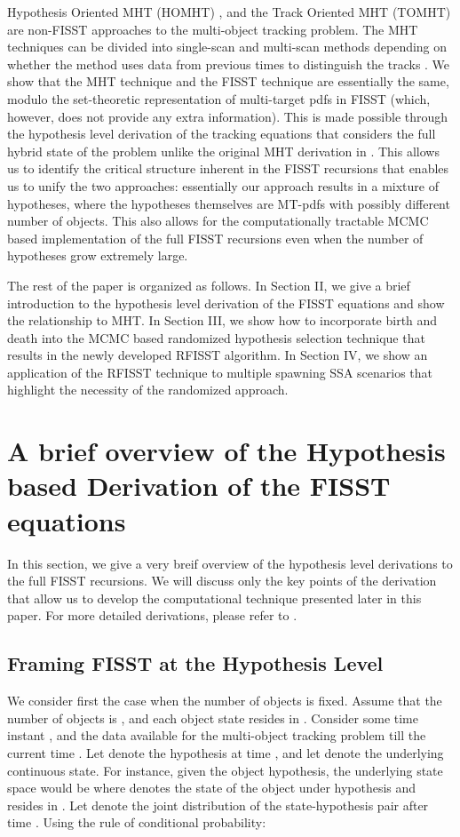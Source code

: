 \documentclass[10pt, conference]{IEEEtran}
\begin{document}
Hypothesis Oriented MHT (HOMHT) \cite{HOMHT, BarShalom1, BarShalom2, mcmcda}, and the Track Oriented MHT (TOMHT) \cite{TOMHT} are non-FISST approaches to the multi-object tracking problem. The MHT techniques can be divided into single-scan and multi-scan methods depending on whether the method uses data from previous times to distinguish the tracks \cite{BarShalom1, jpda, mcmcda}. We show that  the MHT technique and the FISST technique are essentially the same, modulo the set-theoretic representation of multi-target pdfs in FISST (which, however, does not provide any extra information). This is made possible through the hypothesis level derivation of the tracking equations that considers the full hybrid state of the problem unlike the original MHT derivation in \cite{HOMHT}. This allows us to identify the critical structure inherent in the FISST recursions that enables us to unify the two approaches: essentially our approach results in a mixture of hypotheses, where the hypotheses themselves are MT-pdfs with possibly different number of objects. This also allows for the computationally tractable MCMC based implementation of the full FISST recursions even when the number of hypotheses grow extremely large.

The rest of the paper is organized as follows. In Section II, we give a brief introduction to the hypothesis level derivation of the FISST equations and show the relationship to MHT. In Section III, we show how to incorporate birth and death into the MCMC based randomized hypothesis selection technique that results in the newly developed RFISST algorithm. In Section IV, we show an application of the RFISST technique to multiple spawning SSA scenarios that highlight the necessity of the randomized approach.    


\section{A brief overview of the Hypothesis based Derivation of the FISST equations}
In this section, we give a very breif overview of the hypothesis level derivations to the full FISST recursions. We will discuss only the key points of the derivation that allow us to develop the computational technique presented later in this paper. For more detailed derivations, please refer to \cite{Faber1,Faber2}.
\subsection{Framing FISST at the Hypothesis Level}
We consider first the case when the number of objects is fixed. Assume that the number of objects is , and each object state resides in . Consider some time instant , and the data available for the multi-object tracking problem till the current time . Let  denote the  hypothesis at time , and let  denote the underlying continuous state. For instance, given the  object hypothesis, the underlying state space would be  where  denotes the state of the  object under hypothesis  and resides in . Let  denote the joint distribution of the state-hypothesis pair after time . Using the rule of conditional probability:
 
\end{document}
